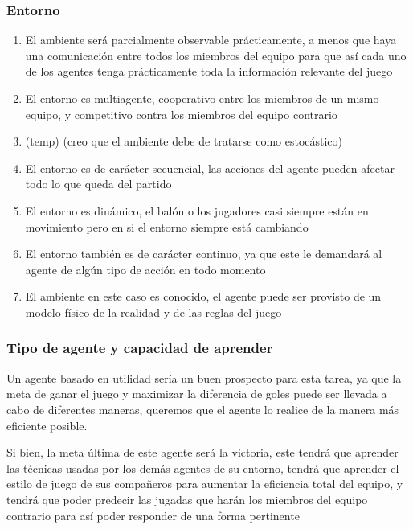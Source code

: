 \documentclass{article}
\begin{document}
            \subsubsection{Entorno}
                \begin{enumerate}
                    \item El ambiente será parcialmente observable prácticamente, a menos que haya una comunicación entre todos los miembros del equipo para que así cada uno de los agentes tenga prácticamente toda la información relevante del juego
                    \item El entorno es multiagente, cooperativo entre los miembros de un mismo equipo, y competitivo contra los miembros del equipo contrario
                    \item (temp) (creo que el ambiente debe de tratarse como estocástico)
                    \item El entorno es de carácter secuencial, las acciones del agente pueden afectar todo lo que queda del partido
                    \item El entorno es dinámico, el balón o los jugadores casi siempre están en movimiento pero en si el entorno siempre está cambiando
                    \item El entorno también es de carácter continuo, ya que este le demandará al agente de algún tipo de acción en todo momento
                    \item El ambiente en este caso es conocido, el agente puede ser provisto de un modelo físico de la realidad y de las reglas del juego
                \end{enumerate}

            \subsubsection{Tipo de agente y capacidad de aprender}
                Un agente basado en utilidad sería un buen prospecto para esta tarea, ya que la meta de ganar el juego y maximizar la diferencia de goles puede ser llevada a cabo de diferentes maneras, queremos que el agente lo realice de la manera más eficiente posible.
                
                Si bien, la meta última de este agente será la victoria, este tendrá que aprender las técnicas usadas por los demás agentes de su entorno, tendrá que aprender el estilo de juego de sus compañeros para aumentar la eficiencia total del equipo, y tendrá que poder predecir las jugadas que harán los miembros del equipo contrario para así poder responder de una forma pertinente
\end{document}

